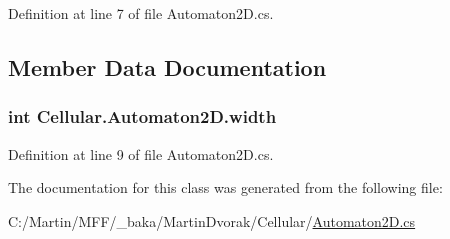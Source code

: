 Definition at line 7 of file Automaton2\+D.\+cs.



\subsection{Member Data Documentation}
\hypertarget{class_cellular_1_1_automaton2_d_a1e9e5ec637c747a859c346839c90d174}{}
\subsubsection[{width}]{\setlength{\rightskip}{0pt plus 5cm}int Cellular.\+Automaton2\+D.\+width\hspace{0.3cm}{\ttfamily [protected]}}\label{class_cellular_1_1_automaton2_d_a1e9e5ec637c747a859c346839c90d174}


Definition at line 9 of file Automaton2\+D.\+cs.



The documentation for this class was generated from the following file\+:\begin{DoxyCompactItemize}
\item 
C\+:/\+Martin/\+M\+F\+F/\+\_\+baka/\+Martin\+Dvorak/\+Cellular/\hyperlink{_automaton2_d_8cs}{Automaton2\+D.\+cs}\end{DoxyCompactItemize}
